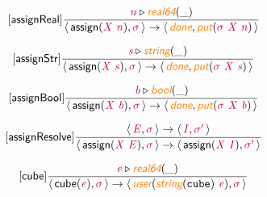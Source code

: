 \documentclass[10pt,leqno,fleqn]{article}
\newcommand{\artVariable}[1]{\mbox{\color{purple}\em #1\/}}
\newcommand{\artConstructor}[1]{\mbox{\sf #1}}
\newcommand{\artCaseInsensitiveLiteral}[1]{\mbox{\tt #1}}
\newcommand{\artSpecial}[1]{\mbox{\color{orange}\sf\em #1}}
\begin{document}
\begin{equation}
\tag*{[\artConstructor{\sf assignReal}]}
\begin{split}\frac{ \artVariable{n}\triangleright \artSpecial{real64}(\_) }{\langle\, \artConstructor{\sf assign}(\artVariable{X}\ \artVariable{n}), \artVariable{$\sigma$}\,\rangle \rightarrow \langle\, \artSpecial{done}, \artSpecial{put}(\artVariable{$\sigma$}\ \artVariable{X}\ \artVariable{n})\,\rangle }
\end{split}
\end{equation}

\begin{equation}
\tag*{[\artConstructor{\sf assignStr}]}
\begin{split}\frac{ \artVariable{s}\triangleright \artSpecial{string}(\_) }{\langle\, \artConstructor{\sf assign}(\artVariable{X}\ \artVariable{s}), \artVariable{$\sigma$}\,\rangle \rightarrow \langle\, \artSpecial{done}, \artSpecial{put}(\artVariable{$\sigma$}\ \artVariable{X}\ \artVariable{s})\,\rangle }
\end{split}
\end{equation}

\begin{equation}
\tag*{[\artConstructor{\sf assignBool}]}
\begin{split}\frac{ \artVariable{b}\triangleright \artSpecial{bool}(\_) }{\langle\, \artConstructor{\sf assign}(\artVariable{X}\ \artVariable{b}), \artVariable{$\sigma$}\,\rangle \rightarrow \langle\, \artSpecial{done}, \artSpecial{put}(\artVariable{$\sigma$}\ \artVariable{X}\ \artVariable{b})\,\rangle }
\end{split}
\end{equation}

\begin{equation}
\tag*{[\artConstructor{\sf assignResolve}]}
\begin{split}\frac{\langle\, \artVariable{E}, \artVariable{$\sigma$}\,\rangle \rightarrow \langle\, \artVariable{I}, \artVariable{$\sigma$\/$^\prime$}\,\rangle }{\langle\, \artConstructor{\sf assign}(\artVariable{X}\ \artVariable{E}), \artVariable{$\sigma$}\,\rangle \rightarrow \langle\, \artConstructor{\sf assign}(\artVariable{X}\ \artVariable{I}), \artVariable{$\sigma$\/$^\prime$}\,\rangle }
\end{split}
\end{equation}

\begin{equation}
\tag*{[\artConstructor{\sf cube}]}
\begin{split}\frac{ \artVariable{e}\triangleright \artSpecial{real64}(\_) }{\langle\, \artConstructor{\sf cube}(\artVariable{e}), \artVariable{$\sigma$}\,\rangle \rightarrow \langle\, \artSpecial{user}(\artSpecial{string}(\artCaseInsensitiveLiteral{cube})\ \artVariable{e}), \artVariable{$\sigma$}\,\rangle }
\end{split}
\end{equation}
\end{document}
